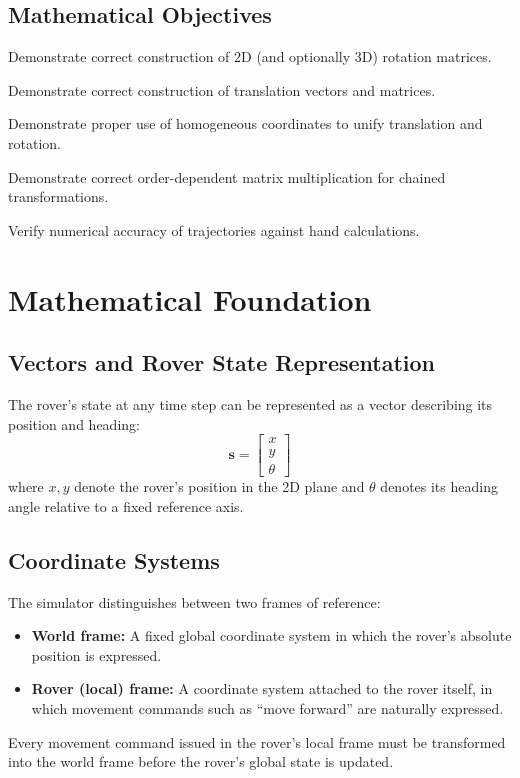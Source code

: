 \documentclass[12pt]{report}
\begin{document}
\section{Mathematical Objectives}
\begin{checklist}
\item Demonstrate correct construction of 2D (and optionally 3D) rotation matrices.
\item Demonstrate correct construction of translation vectors and matrices.
\item Demonstrate proper use of homogeneous coordinates to unify translation and rotation.
\item Demonstrate correct order-dependent matrix multiplication for chained transformations.
\item Verify numerical accuracy of trajectories against hand calculations.
\end{checklist}

\chapter{Mathematical Foundation}

\section{Vectors and Rover State Representation}
The rover's state at any time step can be represented as a vector describing its position and heading:
\begin{equation}
\mathbf{s} = \begin{bmatrix} x \\ y \\ \theta \end{bmatrix}
\end{equation}
where $x,y$ denote the rover's position in the 2D plane and $\theta$ denotes its heading angle relative to a fixed reference axis.

\section{Coordinate Systems}
The simulator distinguishes between two frames of reference:
\begin{itemize}
\item \textbf{World frame:} A fixed global coordinate system in which the rover's absolute position is expressed.
\item \textbf{Rover (local) frame:} A coordinate system attached to the rover itself, in which movement commands such as ``move forward'' are naturally expressed.
\end{itemize}
Every movement command issued in the rover's local frame must be transformed into the world frame before the rover's global state is updated.
\end{document}
